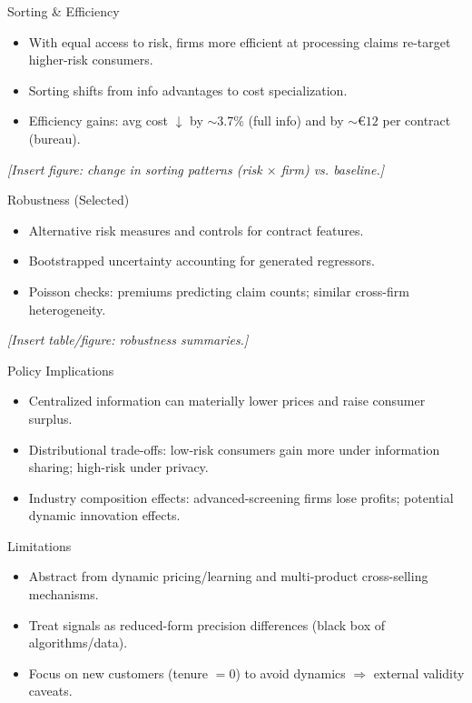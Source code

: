 \documentclass[10pt,aspectratio=169]{beamer}
\begin{document}
\begin{frame}{Sorting \& Efficiency}
\justifying
\begin{itemize}
  \item With equal access to risk, firms more efficient at processing claims re-target higher-risk consumers.
  \item Sorting shifts from info advantages to cost specialization.
  \item Efficiency gains: avg cost $\downarrow$ by $\sim$3.7\% (full info) and by $\sim€12$ per contract (bureau).
\end{itemize}
\vspace{0.75em}
\begin{center}
\textit{[Insert figure: change in sorting patterns (risk $\times$ firm) vs. baseline.]}
\end{center}
\end{frame}

\begin{frame}{Robustness (Selected)}
\justifying
\begin{itemize}
  \item Alternative risk measures and controls for contract features.
  \item Bootstrapped uncertainty accounting for generated regressors.
  \item Poisson checks: premiums predicting claim counts; similar cross-firm heterogeneity.
\end{itemize}
\vspace{0.75em}
\begin{center}
\textit{[Insert table/figure: robustness summaries.]}
\end{center}
\end{frame}

\begin{frame}{Policy Implications}
\justifying
\begin{itemize}
  \item Centralized information can materially lower prices and raise consumer surplus.
  \item Distributional trade-offs: low-risk consumers gain more under information sharing; high-risk under privacy.
  \item Industry composition effects: advanced-screening firms lose profits; potential dynamic innovation effects.
\end{itemize}
\end{frame}

\begin{frame}{Limitations}
\justifying
\begin{itemize}
  \item Abstract from dynamic pricing/learning and multi-product cross-selling mechanisms.
  \item Treat signals as reduced-form precision differences (black box of algorithms/data).
  \item Focus on new customers (tenure $=0$) to avoid dynamics $\Rightarrow$ external validity caveats.
\end{itemize}
\end{frame}
\end{document}
